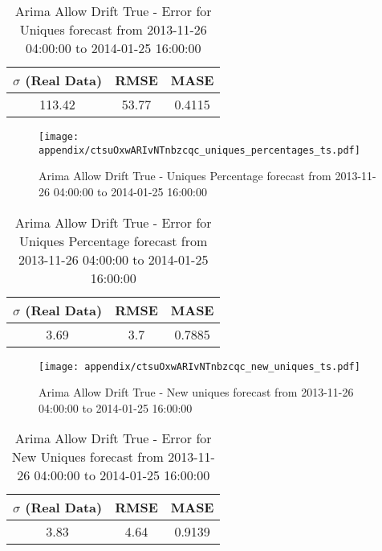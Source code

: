 \begin{table}[H]
\centering
\footnotesize
\begin{tabular}{ccc}
$\sigma$ (Real Data) & RMSE & MASE   \\ \hline
113.42 & 53.77 & 0.4115 \\
\end{tabular}

\vspace{0.5cm}

\caption{
Arima Allow Drift True - Error for Uniques forecast from 2013-11-26 04:00:00 to 2014-01-25 16:00:00}
\end{table}

\begin{figure}[H] \begin{center} \leavevmode
\texttt{[image: appendix/ctsuOxwARIvNTnbzcqc\_uniques\_percentages\_ts.pdf]} \caption{
Arima Allow Drift True - Uniques Percentage forecast from 2013-11-26 04:00:00 to 2014-01-25 16:00:00} \label{fig:appendix/ctsuOxwARIvNTnbzcqc_uniques_percentages_ts.pdf} \end{center}
\end{figure}

\begin{table}[H]
\centering
\footnotesize
\begin{tabular}{ccc}
$\sigma$ (Real Data) & RMSE & MASE   \\ \hline
3.69 & 3.7 & 0.7885 \\
\end{tabular}

\vspace{0.5cm}

\caption{
Arima Allow Drift True - Error for Uniques Percentage forecast from 2013-11-26 04:00:00 to 2014-01-25 16:00:00}
\end{table}

\begin{figure}[H] \begin{center} \leavevmode
\texttt{[image: appendix/ctsuOxwARIvNTnbzcqc\_new\_uniques\_ts.pdf]} \caption{
Arima Allow Drift True - New uniques forecast from 2013-11-26 04:00:00 to 2014-01-25 16:00:00} \label{fig:appendix/ctsuOxwARIvNTnbzcqc_new_uniques_ts.pdf} \end{center}
\end{figure}

\begin{table}[H]
\centering
\footnotesize
\begin{tabular}{ccc}
$\sigma$ (Real Data) & RMSE & MASE   \\ \hline
3.83 & 4.64 & 0.9139 \\
\end{tabular}

\vspace{0.5cm}

\caption{
Arima Allow Drift True - Error for New Uniques forecast from 2013-11-26 04:00:00 to 2014-01-25 16:00:00}
\end{table}

